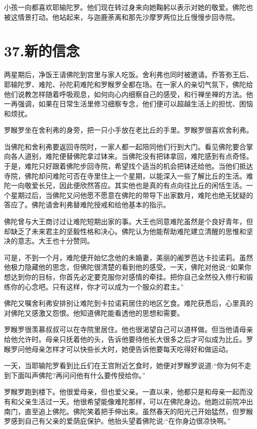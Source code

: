 \documentclass[12pt,twoside,openany]{book}
\begin{document}
小孩一向都喜欢耶输陀罗。他们现在转过身来向她鞠躬以表示对她的敬爱。佛陀也被这情景打动。他站起来，与迦鹿荼离和那先沙摩罗两位比丘慢慢步回寺院。


\chapter{37.新的信念}\label{ch37}

两星期后，净饭王请佛陀到宫里与家人吃饭。舍利弗也同时被邀请。乔答弥王后、耶输陀罗、难陀、孙陀莉难陀和罗睺罗全都在场。在一家人的亲切气氛下，佛陀给他们说教怎样随着呼吸观息，如何向心内细察自己的感受，和行禅坐禅的方法。他一再强调，如果在日常生活里修习细察专念，他们便可以超越生活上的担忧、困恼和烦扰。

罗睺罗坐在舍利弗的身旁，把一只小手放在老比丘的手里。罗睺罗很喜欢舍利弗。

当佛陀和舍利弗要返回寺院时，一家人都一起陪同他们行到大门。看见佛陀要合掌向各人道别，难陀便替佛陀拿过钵来。当佛陀没有把钵拿回，难陀感到有点奇怪。于是，难陀只好跟着佛陀步回寺院，希望找个适当的机会把钵还给他。当他们抵达寺院，佛陀却问难陀可否在寺里住上一个星期，以能深入一些了解比丘的生活。难陀一向敬爱长兄，因此便欣然答应。其实他也是真的有点向往比丘的闲恬生活。一个星期过后，当佛陀又问他愿不愿意在佛陀的带导下出家数月，难陀也绝无犹疑的答应了。佛陀请舍利弗替难陀授戒和给他基本的指示。

佛陀曾与大王商讨过让难陀短期出家的事。大王也同意难陀虽然是个良好青年，但却缺乏了未来君主的坚毅性格和决心。佛陀认为他能帮助难陀建立清醒的思惟和坚决的意志。大王也十分赞同。

可是，不到一个月，难陀便开始忆念他的未婚妻，美丽的阇罗芭达卡拉诺莉。虽然他极力隐藏他的思念，但佛陀很清楚的看到他的感受。一天，佛陀对他说:“如果你想达到你的目标，你首先必定要克服你对感情的牵挂。把你自己全然役入修行和锻练你的心念吧。只有这样，你才可以成为一个服众的君主。”

佛陀又嘱舍利弗安排别让难陀到卡拉诺莉居住的地区乞食。难陀获悉后，心里真的对佛陀又感激又怨恨。他知道佛陀能看透他的思想和需要。

罗睺罗很羡慕叔叔可以在寺院里居住。他也很渴望自己可以道样做。但当他请母亲给他允许时。母亲只抚着他的头，告诉他要待他长大很多之后才可似成为比丘。罗睺罗问他母亲怎样才可以快些长大时，她便告诉他要每天吃得好和做运动。

一天，当耶输陀罗看到比丘们在王宫附近乞食时，她便对罗睺罗说道:“你为何不走到下面叫声佛陀?再问问他有什么要传授给你。”

罗睺罗跑到楼下。他很爱母亲，但也爱父亲。一直以来，他都只是和母亲一起而没有和父亲生活过一天。他很希望能像难陀那样，可以在佛陀身边。他跑过前院冲出南门，直至追上佛陀。佛陀笑着把手伸出来。虽然春天的阳光己开始猛然，但罗睺罗感到自己有父亲的爱荫庇保护。他抬头望着佛陀说:“在你身边很凉快啊。”
\end{document}
